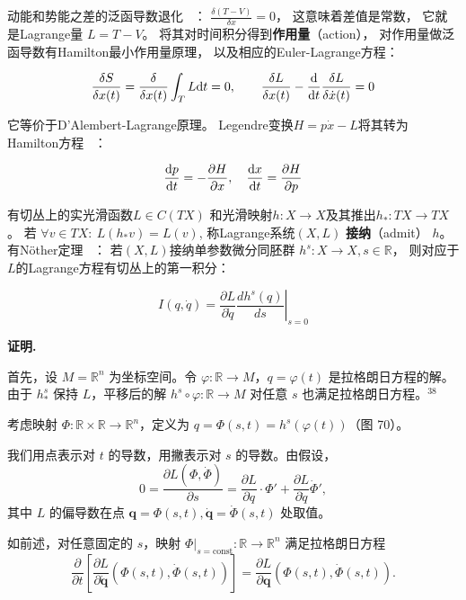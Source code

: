 ﻿\documentclass[10pt,a4paper]{article}
\numberwithin{equation}{section}
\begin{document}
动能和势能之差的泛函导数退化
~\cite{Lancaster2014}：
$\frac{\delta (T - V)}{\delta x} = 0$，
这意味着差值是常数，
它就是Lagrange量
$L = T - V$。
将其对时间积分得到\textbf{作用量}（action），
对作用量做泛函导数有Hamilton最小作用量原理，
以及相应的Euler-Lagrange方程：

\begin{equation}
\frac{\delta S}{\delta x(t)} 
= \frac{\delta}{\delta x(t)}\int_T L \text dt = 0, \qquad
\frac{\delta L}{\delta x(t)} - \frac{\text d}{\text dt} \frac{\delta L}{\delta \dot x(t)} = 0
\label{eq:Euler-Lagrange-eq}
\end{equation}

它等价于D'Alembert-Lagrange原理。
Legendre变换$H = p \dot x - L$将其转为Hamilton方程
~\cite{Arnold1989}：

\begin{equation}
\frac{\text dp}{\text dt} = - \frac{\partial H}{\partial x}, \quad  
\frac{\text dx}{\text dt} = \frac{\partial H}{\partial p}
\label{eq:Hamilton-eq}
\end{equation}

有切丛上的实光滑函数$L \in C(TX)$
和光滑映射$h: X \to X$及其推出$h_*: TX \to TX$。
若 $\forall v \in TX:\ L(h_* v) = L(v)$,
称Lagrange系统$(X,L)$ \textbf{接纳}（admit） $h$。
有Nöther定理
~\cite{Noether1918Invariante}：
若$(X,L)$接纳单参数微分同胚群 $h^s: X \to X, s \in \mathbb R$，
则对应于$L$的Lagrange方程有切丛上的第一积分：

$$
I(q, \dot q) = \left. \frac{\partial L}{\partial \dot{q}} \frac{d h^s(q)}{ds} \right|_{s=0}
$$

\textbf{证明.}

首先，设 \( M = \mathbb{R}^n \) 为坐标空间。令 \( \varphi : \mathbb{R} \to M \)，\( q = \varphi(t) \) 是拉格朗日方程的解。由于 \( h^s_* \) 保持 \( L \)，平移后的解 \( h^s \circ \varphi : \mathbb{R} \to M \) 对任意 \( s \) 也满足拉格朗日方程。\(^{38}\)

考虑映射 \( \Phi : \mathbb{R} \times \mathbb{R} \to \mathbb{R}^n \)，定义为 \( q = \Phi(s, t) = h^s(\varphi(t)) \)（图 70）。

我们用点表示对 \( t \) 的导数，用撇表示对 \( s \) 的导数。由假设，
\[
0 = \frac{\partial L(\Phi, \dot{\Phi})}{\partial s} = \frac{\partial L}{\partial q} \cdot \Phi' + \frac{\partial L}{\partial \dot{q}} \dot{\Phi}',
\]
其中 \( L \) 的偏导数在点 \( \mathbf{q} = \Phi(s, t), \dot{\mathbf{q}} = \dot{\Phi}(s, t) \) 处取值。

如前述，对任意固定的 \( s \)，映射 \( \Phi|_{s=\text{const}} : \mathbb{R} \to \mathbb{R}^n \) 满足拉格朗日方程
\[
\frac{\partial}{\partial t} \left[ \frac{\partial L}{\partial \dot{\mathbf{q}}} (\Phi(s, t), \dot{\Phi}(s, t)) \right] = \frac{\partial L}{\partial \mathbf{q}} (\Phi(s, t), \dot{\Phi}(s, t)).
\]
\end{document}
